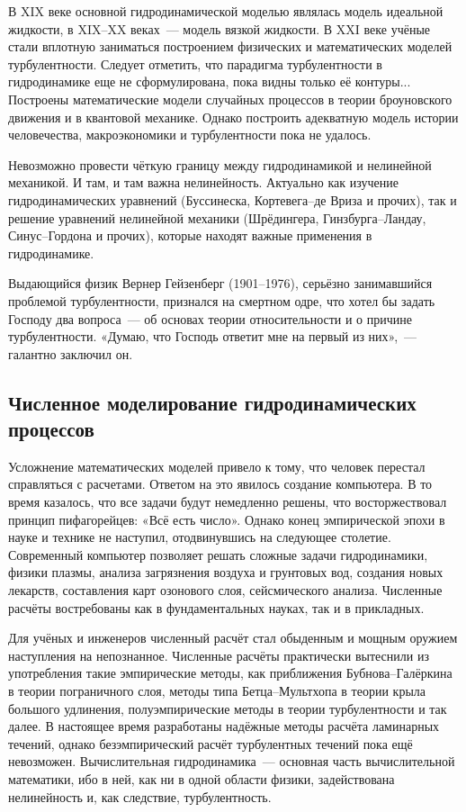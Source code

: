 В XIX веке основной гидродинамической моделью являлась модель идеальной жидкости, в XIX--XX веках~--- 
модель вязкой жидкости. В XXI веке учёные стали вплотную заниматься построением физических и математических
 моделей турбулентности. Следует отметить, что парадигма турбулентности в гидродинамике еще не сформулирована,
  пока видны только её контуры... Построены математические модели случайных процессов в теории броуновского 
  движения и в квантовой механике. Однако построить адекватную модель истории человечества, макроэкономики 
  и турбулентности пока не удалось.

Невозможно провести чёткую границу между гидродинамикой и нелинейной механикой. И там, и там важна нелинейность. 
Актуально как изучение гидродинамических уравнений (Буссинеска, Кортевега--де Вриза и прочих), так и решение 
уравнений нелинейной механики (Шрёдингера, Гинзбурга--Ландау, Синус--Гордона и прочих), которые находят важные 
применения в гидродинамике.

Выдающийся физик Вернер Гейзенберг (1901--1976), серьёзно занимавшийся проблемой турбулентности, признался на 
смертном одре, что хотел бы задать Господу два вопроса~--- об основах теории относительности и о причине 
турбулентности. «Думаю, что Господь ответит мне на первый из них»,~--- галантно заключил он.

\subsection{Численное моделирование гидродинамических процессов}

Усложнение математических моделей привело к тому, что человек перестал справляться с расчетами. Ответом на это 
явилось создание компьютера. В то время казалось, что все задачи будут немедленно решены, что восторжествовал 
принцип пифагорейцев: «Всё есть число». Однако конец эмпирической эпохи в науке и технике не наступил, 
отодвинувшись на следующее столетие. Современный компьютер позволяет решать сложные задачи гидродинамики, 
физики плазмы, анализа загрязнения воздуха и грунтовых вод, создания новых лекарств, составления карт озонового 
слоя, сейсмического анализа. Численные расчёты востребованы как в фундаментальных науках, так и в прикладных.

Для учёных и инженеров численный расчёт стал обыденным и мощным оружием наступления на непознанное. Численные 
расчёты практически вытеснили из употребления такие эмпирические методы, как приближения Бубнова--Галёркина в 
теории пограничного слоя, методы типа Бетца--Мультхопа в теории крыла большого удлинения, полуэмпирические методы 
в теории турбулентности и так далее. В настоящее время разработаны надёжные методы расчёта ламинарных течений, 
однако безэмпирический расчёт турбулентных течений пока ещё невозможен. Вычислительная гидродинамика~--- 
основная часть вычислительной математики, ибо в ней, как ни в одной области физики, задействована нелинейность 
и, как следствие, турбулентность.
